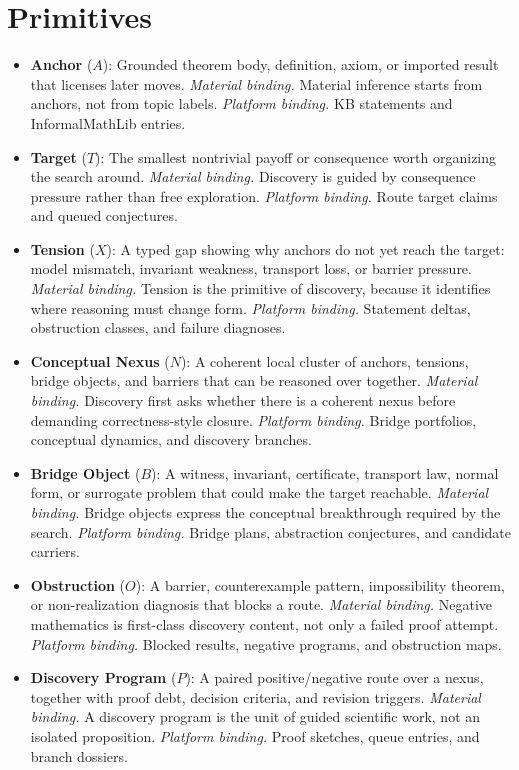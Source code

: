 \documentclass[11pt]{article}
\begin{document}
\section{Primitives}
\begin{itemize}[leftmargin=*,itemsep=0.25em]
\item \textbf{Anchor} ($ A $): Grounded theorem body, definition, axiom, or imported result that licenses later moves. \emph{Material binding.} Material inference starts from anchors, not from topic labels. \emph{Platform binding.} KB statements and InformalMathLib entries.
\item \textbf{Target} ($ T $): The smallest nontrivial payoff or consequence worth organizing the search around. \emph{Material binding.} Discovery is guided by consequence pressure rather than free exploration. \emph{Platform binding.} Route target claims and queued conjectures.
\item \textbf{Tension} ($ X $): A typed gap showing why anchors do not yet reach the target: model mismatch, invariant weakness, transport loss, or barrier pressure. \emph{Material binding.} Tension is the primitive of discovery, because it identifies where reasoning must change form. \emph{Platform binding.} Statement deltas, obstruction classes, and failure diagnoses.
\item \textbf{Conceptual Nexus} ($ N $): A coherent local cluster of anchors, tensions, bridge objects, and barriers that can be reasoned over together. \emph{Material binding.} Discovery first asks whether there is a coherent nexus before demanding correctness-style closure. \emph{Platform binding.} Bridge portfolios, conceptual dynamics, and discovery branches.
\item \textbf{Bridge Object} ($ B $): A witness, invariant, certificate, transport law, normal form, or surrogate problem that could make the target reachable. \emph{Material binding.} Bridge objects express the conceptual breakthrough required by the search. \emph{Platform binding.} Bridge plans, abstraction conjectures, and candidate carriers.
\item \textbf{Obstruction} ($ O $): A barrier, counterexample pattern, impossibility theorem, or non-realization diagnosis that blocks a route. \emph{Material binding.} Negative mathematics is first-class discovery content, not only a failed proof attempt. \emph{Platform binding.} Blocked results, negative programs, and obstruction maps.
\item \textbf{Discovery Program} ($ P $): A paired positive/negative route over a nexus, together with proof debt, decision criteria, and revision triggers. \emph{Material binding.} A discovery program is the unit of guided scientific work, not an isolated proposition. \emph{Platform binding.} Proof sketches, queue entries, and branch dossiers.

\end{itemize}
\end{document}
